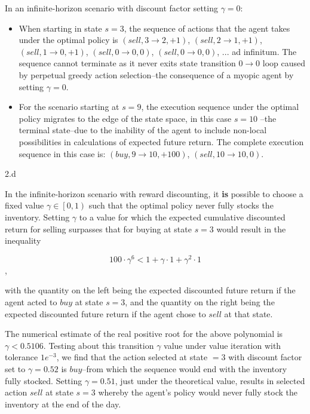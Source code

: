 \begin{answer}
  In an infinite-horizon scenario with discount factor setting $\gamma = 0$:
  \begin{itemize}
    \item When starting in state $s = 3$, the sequence of actions that the agent takes under the optimal
    policy is $(sell, 3 \rightarrow 2, +1)$, $(sell, 2 \rightarrow 1, +1)$, $(sell, 1 \rightarrow 0, +1)$, 
    $(sell, 0 \rightarrow 0, 0)$, $(sell, 0 \rightarrow 0, 0)$, ... ad infinitum.  The sequence cannot terminate as 
    it never exits state transition $0 \rightarrow 0$ loop caused by perpetual greedy action selection--the 
    consequence of a myopic agent by setting $\gamma = 0$.

    \item For the scenario starting at $s = 9$, the execution sequence under the optimal policy migrates
    to the edge of the state space, in this case $s = 10$ --the terminal state--due to the inability of the agent 
    to include non-local possibilities in calculations of expected future return.  The complete execution sequence in 
    this case is: $(buy, 9 \rightarrow 10, +100)$, $(sell, 10 \rightarrow 10, 0)$.
  \end{itemize}
\end{answer}
\clearpage

\LARGE
2.d
\normalsize

\begin{answer}
  In the infinite-horizon scenario with reward discounting, it {\bf is} possible 
  to choose a fixed value $\gamma \in \left[0, 1\right)$ such that the optimal 
  policy never fully stocks the inventory. Setting $\gamma$ to a value for which 
  the expected cumulative discounted return for selling surpasses that for buying at
  state $s = 3$ would result in the inequality 
  \begin{center}
  $$100 \cdot \gamma^{6} < 1 + \gamma \cdot 1 + \gamma^2 \cdot 1$$,
  \end{center}
  with the quantity on the left being the expected discounted future return if the agent acted to $buy$ at 
  state $s = 3$, and the quantity on the right being the expected discounted future return if the
  agent chose to $sell$ at that state.

  The numerical estimate of the real positive root for the above polynomial is $\gamma < 0.5106$.
  Testing about this transition $\gamma$ value under value iteration with tolerance $1e^{-3}$, we find that
  the action selected at state $ = 3$ with discount factor set to $\gamma = 0.52$ is $buy$--from which the 
  sequence would end with the inventory fully stocked. Setting $\gamma = 0.51$, just under the theoretical 
  value, results in selected action $sell$ at state $s = 3$ whereby the agent's policy would 
  never fully stock the inventory at the end of the day.
\end{answer}
\clearpage


